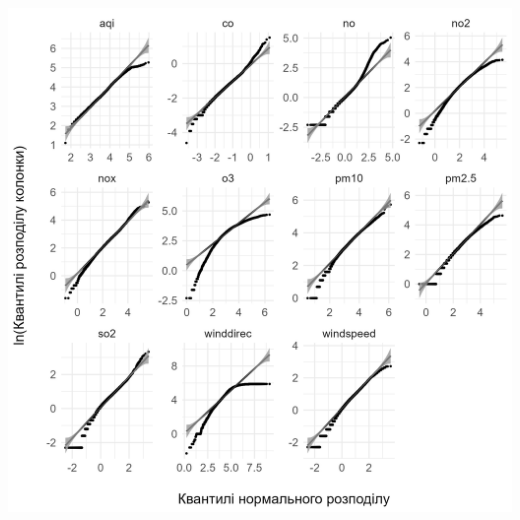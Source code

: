 \documentclass[./report.tex]{subfiles}
\begin{document}
\begin{enumerate}
    \includegraphics[width=6in]{plots/qq_tidy/qq-log.png}

\end{enumerate}
\end{document}
